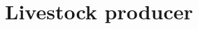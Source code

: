 \documentclass[one column,a4paper]{article}
\theoremstyle{definition}
\newcommand{\DiscFact}			{\mathsf{df}_y}
\newcommand{\Cost}			{\mathscr{C}}
\newcommand{\Area}			{{A}}
\newcommand{\pr}			{\pi}
\newcommand{\Q}			{\mathcal{Q}}
\newcommand{\C}			{C} %
\newcommand{\F}			{F} %
\newcommand{\Yld}			{\mathcal{Y}_{ynf}}
\newcommand{\QFf}			{\textcolor{blue} {\Q^{\F}_{ynf}}}
\newcommand{\piF}		{\textcolor{dgreen} {\pr^{\F}_{ynf}}}
\newcommand{\CsF}			{\textcolor{red} {\Cost^{\F}_{ynf}}}
\newcommand{\CsConv}[1][y]		{\textcolor{red} {\Cost^{\text{conv}}_{#1n}}}
\newcommand{\CsChg}[1][y]			{\textcolor{red} {\Cost^{\text{change}}_{#1n}}}
\newcommand{\AF}[1][ynf]		{\textcolor{cyan}{\Area^{\F}_{{#1}}}}
\numberwithin{equation}			{section}
\newcommand{\da}			{\textcolor{teal} {\delta^1_{yn}}}
\newcommand{\db}			{\textcolor{teal} {\delta^2_{ynf}}}
\begin{document}




\section{Livestock producer} %
\end{document}
